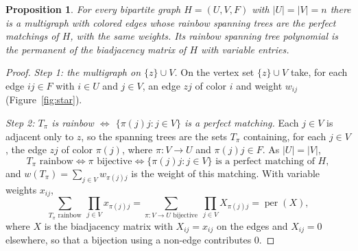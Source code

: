 \documentclass[11pt]{article}
\newtheorem{proposition}[theorem]{Proposition}
\begin{document}
\begin{proposition}
\label{prop:star}
For every bipartite graph $H=(U,V,F)$ with $|U|=|V|=n$ there is a multigraph with
colored edges whose rainbow spanning trees are the perfect matchings of $H$, with
the same weights.  Its rainbow spanning tree polynomial is the permanent of the
biadjacency matrix of $H$ with variable entries.
\end{proposition}

\begin{proof}
\emph{Step 1: the multigraph on $\{z\}\cup V$.}  On the vertex set $\{z\}\cup V$ take, for each edge
$ij\in F$ with $i\in U$ and $j\in V$, an edge $zj$ of color $i$ and weight
$w_{ij}$ (Figure~\ref{fig:star}).

\emph{Step 2: $T_\pi$ is rainbow $\iff$ $\{\pi(j)j:j\in V\}$ is a perfect matching.}  Each $j\in V$ is adjacent only to $z$, so the
spanning trees are the sets $T_\pi$ containing, for each $j\in V$, the edge $zj$ of
color $\pi(j)$, where $\pi:V\to U$ and $\pi(j)j\in F$.  As $|U|=|V|$,
\[
  T_\pi\text{ rainbow}\iff\pi\text{ bijective}
  \iff\{\pi(j)j:j\in V\}\text{ is a perfect matching of }H,
\]
and $w(T_\pi)=\sum_{j\in V}w_{\pi(j)j}$ is the weight of this matching.  With
variable weights $x_{ij}$,
\[
  \sum_{T_\pi\text{ rainbow}}\ \prod_{j\in V}x_{\pi(j)j}
  =\sum_{\pi:V\to U\text{ bijective}}\ \prod_{j\in V}X_{\pi(j)j}=\operatorname{per}(X),
\]
where $X$ is the biadjacency matrix with $X_{ij}=x_{ij}$ on the edges and
$X_{ij}=0$ elsewhere, so that a bijection using a non-edge contributes $0$.
\end{proof}
\end{document}
